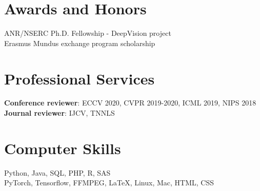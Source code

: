 \documentclass[10pt]{res} %
\begin{document}
\begin{resume}

\section{\large Awards and Honors} 
ANR/NSERC Ph.D. Fellowship - DeepVision project \\
Erasmus Mundus exchange program scholarship


\section{\large Professional Services}
\textbf{Conference reviewer}: ECCV 2020, CVPR 2019-2020, ICML 2019, NIPS 2018 \\
\textbf{Journal reviewer}: IJCV, TNNLS


\section{\large Computer Skills} 
Python, Java, SQL, PHP, R, SAS \\
PyTorch, Tensorflow, FFMPEG, \LaTeX, Linux, Mac, HTML, CSS



\end{resume}
\end{document}
